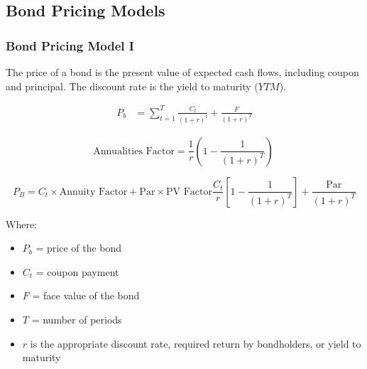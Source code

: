 \documentclass[
]{book}
\providecommand{\tightlist}{%
  \setlength{\itemsep}{0pt}\setlength{\parskip}{0pt}}
\begin{document}
\hypertarget{bond-pricing-models}{%
\subsection{Bond Pricing Models}\label{bond-pricing-models}}

\hypertarget{bond-pricing-model-i}{%
\subsubsection{Bond Pricing Model I}\label{bond-pricing-model-i}}

The price of a bond is the present value of expected cash flows,
including coupon and principal. The discount rate is the yield to
maturity (\(YTM\)).

\[
\begin{align}
P_b &= \sum_{t=1}^{T} \frac{C_t}{(1 + r)^t} + \frac{F}{(1 + r)^T}
\end{align}
\]

\[
\text{Annualities Factor} = \frac{1}{r} \left( 1 - \frac{1}{(1 + r)^T} \right)\
\]

\[
P_B = C_t \times \text{Annuity Factor} + \text{Par} \times \text{PV Factor}\frac{C_t}{r} \left[ 1 - \frac{1}{(1 + r)^T} \right] + \frac{\text{Par}}{(1 + r)^T}
\]

Where:

\begin{itemize}
\tightlist
\item
  \(P_b\) = price of the bond
\item
  \(C_t\) = coupon payment
\item
  \(F\) = face value of the bond
\item
  \(T\) = number of periods
\item
  \(r\) is the appropriate discount rate, required return by
  bondholders, or yield to maturity
\end{itemize}
\end{document}
